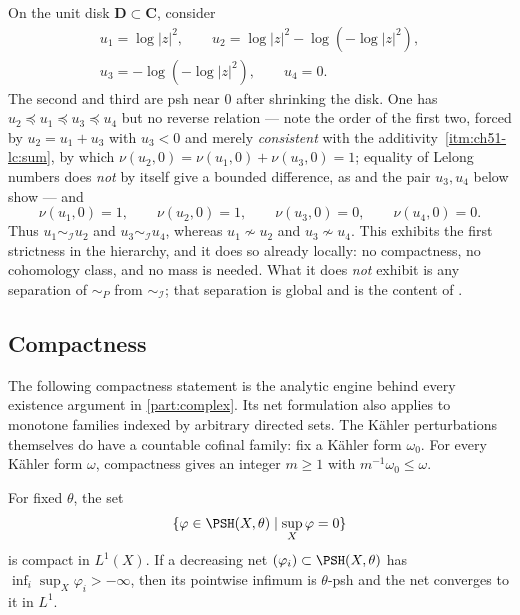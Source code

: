 \begin{example}
\label{ex:ch51-disk-three-types}
On the unit disk \(\mathbf D\subset\mathbf C\), consider
\[
 \begin{gathered}
 u_1=\log|z|^2,
 \qquad
 u_2=\log|z|^2-\log(-\log|z|^2),\\
 u_3=-\log(-\log|z|^2),
 \qquad
 u_4=0 .
 \end{gathered}
\]
The second and third are psh near \(0\) after shrinking the disk.  One has
\(u_2\preceq u_1\preceq u_3\preceq u_4\) but no reverse relation --- note
the order of the first two, forced by \(u_2=u_1+u_3\) with \(u_3<0\) and
merely \emph{consistent} with the additivity
\,\cref{itm:ch51-lc:sum}, by which
\(\nu(u_2,0)=\nu(u_1,0)+\nu(u_3,0)=1\); equality of Lelong numbers does
\emph{not} by itself give a bounded difference, as
 and the pair \(u_3,u_4\) below show ---
and
\[
 \nu(u_1,0)=1,\qquad
 \nu(u_2,0)=1,\qquad
 \nu(u_3,0)=0,\qquad
 \nu(u_4,0)=0 .
\]
Thus \(u_1\sim_{\mathcal I}u_2\) and \(u_3\sim_{\mathcal I}u_4\), whereas
\(u_1\not\sim u_2\) and \(u_3\not\sim u_4\).  This exhibits the first
strictness in the hierarchy, and it does so already locally: no
compactness, no cohomology class, and no mass is needed.  What it does
\emph{not} exhibit is any separation of \(\sim_P\) from
\(\sim_{\mathcal I}\); that separation is global and is the content of
.
\end{example}

\subsection{Compactness}
\label{sec:ch51-compactness}

The following compactness statement is the analytic engine behind every
existence argument in \cref{part:complex}. Its net formulation also
applies to monotone families indexed by arbitrary directed sets.
The K\"ahler perturbations themselves do have a countable cofinal
family: fix a K\"ahler form $\omega_0$.
For every K\"ahler form $\omega$, compactness gives an integer
$m\geq1$ with $m^{-1}\omega_0\leq\omega$.

\begin{proposition}\label{prop:complex-l1-compactness}
For fixed \(\theta\), the set
\[
     \{\varphi\in\PSH(X,\theta)\mid \sup_X\varphi=0\}
\]
is compact in \(L^1(X)\).  If a decreasing net
\((\varphi_i)\subset\PSH(X,\theta)\) has
\(\inf_i\sup_X\varphi_i>-\infty\), then its pointwise infimum is
\(\theta\)-psh and the net converges to it in \(L^1\).
\end{proposition}

